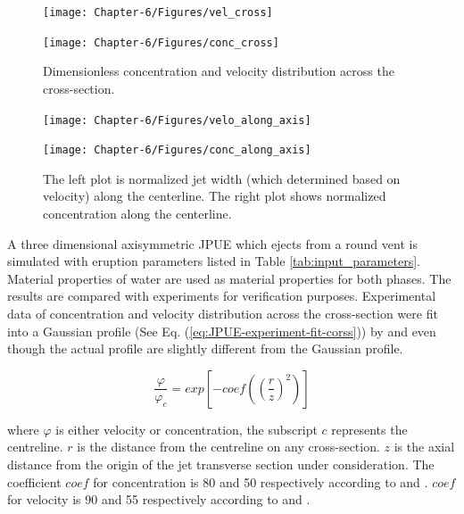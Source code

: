 \begin{figure}
    \centering
    \begin{minipage}{.49\textwidth}
        \centering
        \texttt{[image: Chapter-6/Figures/vel\_cross]}
    \end{minipage}%
    \begin{minipage}{.49 \textwidth}
        \centering
        \texttt{[image: Chapter-6/Figures/conc\_cross]}
    \end{minipage}%
    \caption{Dimensionless concentration and velocity distribution across the cross-section.}
    \label{fig:JPUE_cross-section}
\end{figure}

\begin{figure}
    \centering
    \begin{minipage}{.49\textwidth}
        \centering
        \texttt{[image: Chapter-6/Figures/velo\_along\_axis]}
    \end{minipage}%
    \begin{minipage}{.49 \textwidth}
        \centering
        \texttt{[image: Chapter-6/Figures/conc\_along\_axis]}
    \end{minipage}%
    \caption{The left plot is normalized jet width (which determined based on velocity) along the centerline. The right plot shows normalized concentration along the centerline.}
    \label{fig:JPUE_along-axis}
\end{figure}

A three dimensional axisymmetric JPUE which ejects from a round vent is simulated with eruption parameters listed in Table \ref{tab:input_parameters}. Material properties of water are used as material properties for both phases. The results are compared with experiments \citep {george1977turbulence, papanicolaou1988investigations} for verification purposes. Experimental data of concentration and velocity distribution across the cross-section were fit into a Gaussian profile (See Eq. (\ref{eq:JPUE-experiment-fit-corss})) by \citet{papanicolaou1988investigations} and  \citet{ george1977turbulence} even though the actual profile are slightly different from the Gaussian profile.

\begin{equation}
\dfrac{\varphi}{\varphi_c}=exp \left[-coef\left( \left(\dfrac{r}{z}\right)^2\right)\right]
\label{eq:JPUE-experiment-fit-corss}
\end{equation}

where $\varphi$ is either velocity or concentration, the subscript $c$ represents the centreline. $r$ is the distance from the centreline on any cross-section. $z$ is the axial distance from the origin of the jet transverse section under consideration. 
The coefficient $coef$ for concentration is 80 and 50 respectively according to \citet{george1977turbulence} and \citet{papanicolaou1988investigations}.
$coef$ for velocity is 90 and 55 respectively according to \citet{george1977turbulence} and \citet{papanicolaou1988investigations}. 

